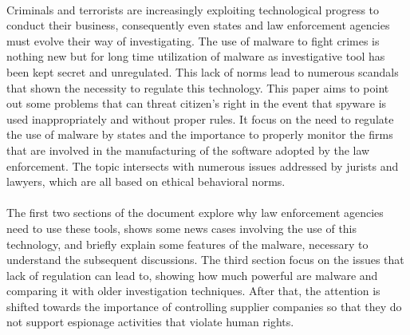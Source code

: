 \paragraph{}
Criminals and terrorists are increasingly exploiting technological progress to conduct their business, consequently even states and law enforcement agencies must evolve their way of investigating. The use of malware to fight crimes is nothing new but for long time utilization of malware as investigative tool has been kept secret and unregulated. This lack of norms lead to numerous scandals that shown the necessity to regulate this technology. This paper aims to point out some problems that can threat citizen's right in the event that spyware is used inappropriately and without proper rules. It focus on the need to regulate the use of malware by states and the importance to properly monitor the firms that are involved in the manufacturing of the software adopted by the law enforcement. The topic intersects with numerous issues addressed by jurists and lawyers, which are all based on ethical behavioral norms.       
\paragraph{}
The first two sections of the document explore why law enforcement agencies need to use these tools, shows some news cases involving the use of this technology, and briefly explain some features of the malware, necessary to understand the subsequent discussions. The third section focus on the issues that lack of regulation can lead to, showing how much powerful are malware and comparing it with older investigation techniques. After that, the attention is shifted towards the importance of controlling supplier companies so that they do not support espionage activities that violate human rights. 
